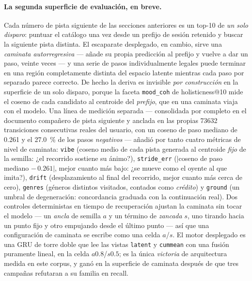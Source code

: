 \documentclass[11pt]{article}
\begin{document}
\paragraph{La segunda superficie de evaluación, en breve.}
\label{sec:nexttrack-walksurface}
Cada número de pista siguiente de las secciones anteriores es un top-10 de
\emph{un solo disparo}: puntuar el catálogo una vez desde un prefijo de sesión
retenido y buscar la siguiente pista distinta. El escaparate desplegado, en cambio,
sirve una \emph{caminata autorregresiva} --- añade su propia predicción al prefijo y
vuelve a dar un paso, veinte veces --- y una serie de pasos individualmente legales
puede terminar en una región completamente distinta del espacio latente mientras
cada paso por separado parece correcto. De hecho la deriva es invisible \emph{por
construcción} en la superficie de un solo disparo, porque la faceta
\texttt{mood\_coh} de holisticness@10 mide el coseno de cada candidato al centroide
del \emph{prefijo}, que en una caminata viaja con el modelo. Una línea de medición
separada --- consolidada por completo en el documento compañero de pista siguiente y
anclada en las propias \num{73632} transiciones consecutivas reales del usuario, con
un coseno de paso mediano de \num{0.261} y el \SI{27.0}{\percent} de los pasos
\emph{negativos} --- añadió por tanto cuatro métricas de nivel de caminata:
\texttt{vibe} (coseno medio de cada pista generada al centroide \emph{fijo} de la
semilla: ¿el recorrido sostiene su ánimo?), \texttt{stride\_err}
($|$coseno de paso mediano $-\,\num{0.261}|$, mejor cuanto más bajo: ¿se mueve como
el oyente al que imita?), \texttt{drift} (desplazamiento al final del recorrido,
mejor cuanto más cerca de cero), \texttt{genres} (géneros distintos visitados,
contados como \emph{crédito}) y \texttt{ground} (un umbral de degeneración:
concordancia graduada con la continuación real). Dos controles deterministas en
tiempo de recuperación ajustan la caminata sin tocar el modelo --- un \emph{ancla}
de semilla $a$ y un término de \emph{zancada} $s$, uno tirando hacia un punto fijo y
otro empujando desde el último punto --- así que una configuración de caminata se
escribe como una celda $a$/$s$. El motor desplegado es una GRU de torre doble que lee
las vistas \texttt{latent} y \texttt{cummean} con una fusión puramente lineal, en la
celda $a\num{0.8}$/$s\num{0.5}$; es la única \emph{victoria} de arquitectura medida
en este corpus, y ganó en la superficie de caminata después de que tres campañas
refutaran a su familia en recall.
\end{document}
